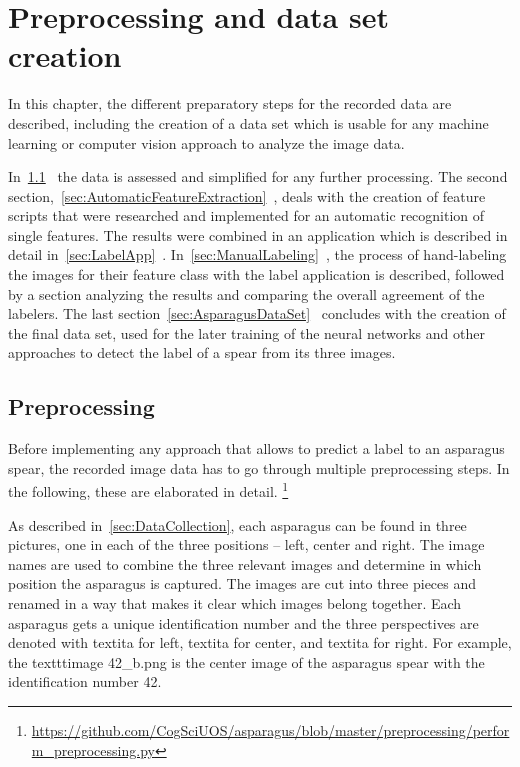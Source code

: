 \section{Preprocessing and data set creation}
\label{ch:Dataset}

In this chapter, the different preparatory steps for the recorded data are described, including the creation of a data set which is usable for any machine learning or computer vision approach to analyze the image data.

In~\ref{sec:Preprocessing}~ the data is assessed and simplified for any further processing. The second section,~\ref{sec:AutomaticFeatureExtraction}~, deals with the creation of feature scripts that were researched and implemented for an automatic recognition of single features.
The results were combined in an application which is described in detail in~\ref{sec:LabelApp}~. In~\ref{sec:ManualLabeling}~, the process of hand-labeling the images for their feature class with the label application is described, followed by a section analyzing the results and comparing the overall agreement of the labelers. The last section~\ref{sec:AsparagusDataSet}~ concludes with the creation of the final data set, used for the later training of the neural networks and other approaches to detect the label of a spear from its three images.


\subsection{Preprocessing}
\label{sec:Preprocessing}

Before implementing any approach that allows to predict a label to an asparagus spear, the recorded image data has to go through multiple preprocessing steps. In the following, these are elaborated in detail. \footnote{\url{https://github.com/CogSciUOS/asparagus/blob/master/preprocessing/perform\_preprocessing.py}}

\bigskip
As described in~\autoref{sec:DataCollection}, each asparagus can be found in three pictures, one in each of the three positions – left, center and right. The image names are used to combine the three relevant images and determine in which position the asparagus is captured. The images are cut into three pieces and renamed in a way that makes it clear which images belong together. Each asparagus gets a unique identification number and the three perspectives are denoted with textit{a} for left, textit{a} for center, and textit{a} for right. For example, the texttt{image 42\_b.png} is the center image of the asparagus spear with the identification number 42. 

